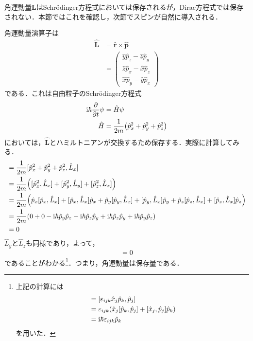 \documentclass{report}
\begin{document}
角運動量$\bm{L}$はSchrödinger方程式においては保存されるが，Dirac方程式では保存されない．本節ではこれを確認し，次節でスピンが自然に導入される．

角運動量演算子は
\begin{align}
  \hat{\bm{L}} &= \hat{\bm{r}} \times \hat{\bm{p}}\\
  &= \begin{pmatrix}
    \hat{y}\hat{p}_z - \hat{z}\hat{p}_y\\
    \hat{z}\hat{p}_x - \hat{x}\hat{p}_z\\
    \hat{x}\hat{p}_y - \hat{y}\hat{p}_x
  \end{pmatrix}
\end{align}
である．これは自由粒子のSchrödinger方程式
\begin{align}
  \mathrm{i} \hbar \frac{\partial}{\partial t}\psi &= \hat{H} \psi\\
  \hat{H} &= \frac{1}{2m}\qty(\hat{p}_x^2 + \hat{p}_y^2 + \hat{p}_z^2)
\end{align}
においては，$\hat{\bm{L}}$とハミルトニアンが交換するため保存する．実際に計算してみる．
\begin{align}
  [\hat{H},\hat{L}_x] &= \frac{1}{2m}[\hat{p}_x^2 + \hat{p}_y^2 + \hat{p}_z^2, \hat{L}_x]\\
  &= \frac{1}{2m}\qty([\hat{p}_x^2, \hat{L}_x] + [\hat{p}_y^2, \hat{L}_y] + [\hat{p}_z^2, \hat{L}_x])\\
  &=\frac{1}{2m}\qty(\hat{p}_x[\hat{p}_x,\hat{L}_x] + [\hat{p}_x,\hat{L}_x]\hat{p}_x + \hat{p}_y[\hat{p}_y,\hat{L}_x] + [\hat{p}_y,\hat{L}_x]\hat{p}_y
  + \hat{p}_z[\hat{p}_z,\hat{L}_x] + [\hat{p}_z,\hat{L}_x]\hat{p}_z)\\
  &= \frac{1}{2m}\qty(0 + 0 -\i\hbar\hat{p}_y\hat{p}_z - \i\hbar\hat{p}_z\hat{p}_y + \i\hbar\hat{p}_z\hat{p}_y + \i\hbar\hat{p}_y\hat{p}_z)\\
  &= 0
\end{align}
$\hat{L}_y$と$\hat{L}_z$も同様であり，よって，
\begin{align}
  [\hat{H},\hat{\bm{L}}] = 0
\end{align}
であることがわかる\footnote{
  上記の計算には
  \begin{align}
    [\hat{L}_i,\hat{p}_j] &= [\epsilon_{ijk}\hat{x}_j\hat{p}_k, \hat{p}_j]\\
    &=\epsilon_{ijk}\qty(\hat{x}_j[\hat{p}_k,\hat{p}_j] + [\hat{x}_j, \hat{p}_j]\hat{p}_k)\\
    &= \i\hbar\epsilon_{ijk}\hat{p}_k
  \end{align}
を用いた．
}．つまり，角運動量は保存量である．
\end{document}

